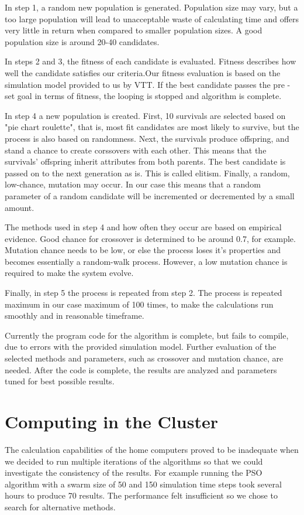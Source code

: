 \documentclass[twoside]{article}
\begin{document}
\begin{multicols}{2}
In step 1, a random new population is generated.  Population size may vary, but a too large population will lead to unacceptable waste of calculating time and offers very little in return when compared to smaller population sizes. A good population size is around 20-40 candidates.

In steps 2 and 3, the fitness of each candidate is evaluated.  Fitness describes how well the candidate satisfies our criteria.Our fitness evaluation is based on the simulation model provided to us by VTT.  If the best candidate passes the pre -set goal in terms of  fitness, the  looping is stopped and algorithm is complete.

In step 4 a new population is created. First, 10 survivals are  selected based on "pie chart roulette", that is, most fit candidates are most likely to survive, but the process is also based on randomness. Next, the survivals produce offspring, and stand a chance to create corssovers with each other. This means that the survivals' offspring inherit attributes from both parents. The best candidate is passed on to the next generation as is. This is called elitism. Finally, a  random, low-chance, mutation may occur. In our case this means that a random parameter  of a random  candidate will be incremented or decremented by a small amount.

The methods used in step 4 and how often they occur are based on empirical evidence. Good  chance for crossover is determined to be around 0.7, for example. Mutation chance needs to be low, or else the process loses it's properties and becomes essentially a random-walk process. However, a low mutation chance is required to make the system evolve.

Finally, in step 5 the process is repeated from step 2. The process is repeated maximum in our case maximum of 100 times, to make the calculations run smoothly and in reasonable timeframe.

Currently the program code for the algorithm is complete, but fails to compile, due to errors with the provided simulation model. Further evaluation of the selected methods and parameters, such as crossover and mutation chance, are needed. After the code is complete, the results are analyzed and parameters tuned for best possible results.


\section{Computing in the Cluster}
The calculation capabilities of the home computers proved to be inadequate when we decided to run multiple iterations of the algorithms so that we could investigate the consistency of the results. For example running the PSO algorithm with a swarm size of 50 and 150 simulation time steps took several hours to produce 70 results. The performance felt insufficient so we chose to search for alternative methods.


\end{multicols}
\end{document}
